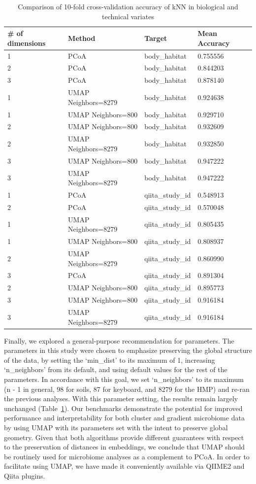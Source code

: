 \begin{table}[]
\caption{Comparison of 10-fold cross-validation accuracy of kNN in biological and technical variates}
\label{umap_table4}
\centering
\begin{tabular}{llll}
\hline \# of dimensions & Method & Target & Mean Accuracy \\ \hline
1 & PCoA & body\_habitat & 0.755556 \\
2 & PCoA & body\_habitat & 0.844203 \\
3 & PCoA & body\_habitat & 0.878140 \\
1 & UMAP Neighbors=8279 & body\_habitat & 0.924638 \\
1 & UMAP Neighbors=800 & body\_habitat & 0.929710 \\
2 & UMAP Neighbors=800 & body\_habitat & 0.932609 \\
2 & UMAP Neighbors=8279 & body\_habitat & 0.932850 \\
3 & UMAP Neighbors=800 & body\_habitat & 0.947222 \\
3 & UMAP Neighbors=8279 & body\_habitat & 0.947222 \\
1 & PCoA & qiita\_study\_id & 0.548913 \\
2 & PCoA & qiita\_study\_id & 0.570048 \\
1 & UMAP Neighbors=8279 & qiita\_study\_id & 0.805435 \\
1 & UMAP Neighbors=800 & qiita\_study\_id & 0.808937 \\
2 & UMAP Neighbors=8279 & qiita\_study\_id & 0.860990 \\
3 & PCoA & qiita\_study\_id & 0.891304 \\
2 & UMAP Neighbors=800 & qiita\_study\_id & 0.895773 \\
3 & UMAP Neighbors=800 & qiita\_study\_id & 0.916184 \\
3 & UMAP Neighbors=8279 & qiita\_study\_id & 0.916184 \\ \hline
\end{tabular}
\end{table}

	Finally, we explored a general-purpose recommendation for parameters. The parameters in this study were chosen to emphasize preserving the global structure of the data, by setting the `min\_dist' to its maximum of 1, increasing `n\_neighbors' from its default, and using default values for the rest of the parameters. In accordance with this goal, we set `n\_neighbors' to its maximum (n - 1 in general, 98 for soils, 87 for keyboard, and 8279 for the HMP) and re-ran the previous analyses. With this parameter setting, the results remain largely unchanged (Table~\ref{umap_table4}).
	Our benchmarks demonstrate the potential for improved performance and interpretability for both cluster and gradient microbiome data by using UMAP with its parameters set with the intent to preserve global geometry. Given that both algorithms provide different guarantees with respect to the preservation of distances in embeddings, we conclude that UMAP should be routinely used for microbiome analyses as a complement to PCoA. In order to facilitate using UMAP, we have made it conveniently available via QIIME2 \cite{Bolyen2019-fq} and Qiita \cite{Gonzalez2018-ez} plugins.
	
